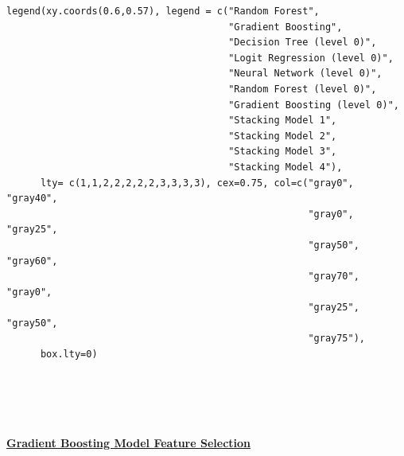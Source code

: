 \documentclass[12pt]{article}
\begin{document}
\begin{lstlisting}
legend(xy.coords(0.6,0.57), legend = c("Random Forest", 
                                       "Gradient Boosting", 
                                       "Decision Tree (level 0)",
                                       "Logit Regression (level 0)", 
                                       "Neural Network (level 0)", 
                                       "Random Forest (level 0)",
                                       "Gradient Boosting (level 0)",
                                       "Stacking Model 1",
                                       "Stacking Model 2", 
                                       "Stacking Model 3", 
                                       "Stacking Model 4"), 
      lty= c(1,1,2,2,2,2,2,3,3,3,3), cex=0.75, col=c("gray0", "gray40", 
                                                     "gray0", "gray25", 
                                                     "gray50", "gray60", 
                                                     "gray70", "gray0", 
                                                     "gray25", "gray50", 
                                                     "gray75"),
      box.lty=0)
       
       
       
       
\end{lstlisting}

\begin{algorithm}
\caption[Quantlet 2: Gradient Boosting Model Feature Selection]{\href{https://github.com/schreckf/NIC_Schreck/blob/master/code}{\color{Black}\large\textbf{Gradient Boosting Model Feature Selection}}}
\end{algorithm}
\end{document}
